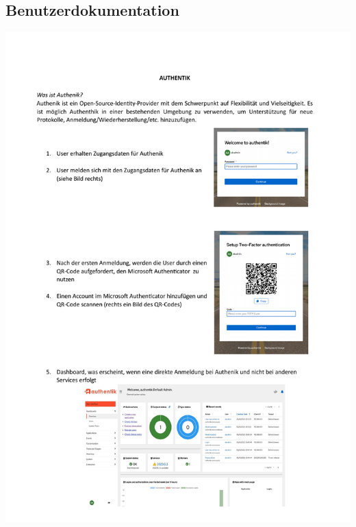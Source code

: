 \subsection{Benutzerdokumentation}
\label{app:Benutzerdokumentation}
\includegraphics{Anhang/Benutzerdokumentation.pdf}